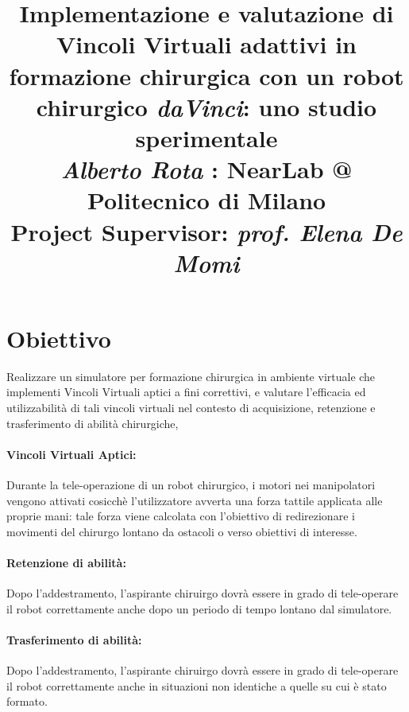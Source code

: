\documentclass{article}
\title{\textbf{Implementazione e valutazione di Vincoli Virtuali adattivi in formazione chirurgica con un robot chirurgico \textit{daVinci}: uno studio sperimentale}
\\
\vspace{0.5cm}\large{\textit{Alberto Rota} : NearLab @ Politecnico di Milano}
\\
\vspace{0.4cm}\small{Project Supervisor: \textit{prof. Elena De Momi}}
}
\author{}
\date{}
\begin{document}
\maketitle

\section{Obiettivo}
Realizzare un simulatore per formazione chirurgica in ambiente virtuale che implementi Vincoli Virtuali aptici a fini correttivi, e valutare l'efficacia ed utilizzabilità di tali vincoli virtuali nel contesto di acquisizione, retenzione e trasferimento di abilità chirurgiche, 

\paragraph*{Vincoli Virtuali Aptici:} 
Durante la tele-operazione di un robot chirurgico, i motori nei manipolatori vengono attivati cosicchè l'utilizzatore avverta una forza tattile applicata alle proprie mani: tale forza viene calcolata con l'obiettivo di redirezionare i movimenti del chirurgo lontano da ostacoli o verso obiettivi di interesse.
\paragraph*{Retenzione di abilità:} 
Dopo l'addestramento, l'aspirante chiruirgo dovrà essere in grado di tele-operare il robot correttamente anche dopo un periodo di tempo lontano dal simulatore.
\paragraph*{Trasferimento di abilità:} 
Dopo l'addestramento, l'aspirante chiruirgo dovrà essere in grado di tele-operare il robot correttamente anche in situazioni non identiche a quelle su cui è stato formato.
\end{document}

